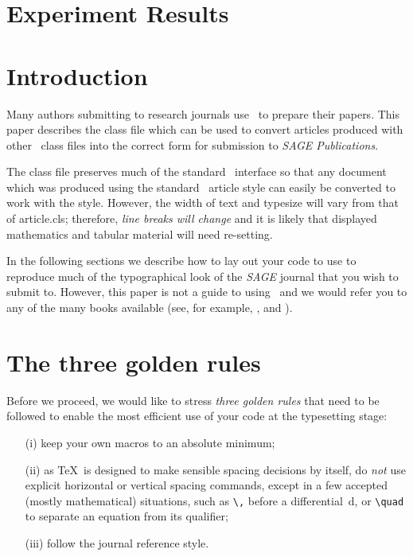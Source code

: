 \documentclass[Afour,sageh,times]{sagej}
\begin{document}
\section{Experiment Results}
\section{Introduction}
Many authors submitting to research journals use \LaTeXe\ to
prepare their papers. This paper describes the
\textsf{\journalclass} class file which can be used to convert
articles produced with other \LaTeXe\ class files into the correct
form for submission to \textit{SAGE Publications}.

The \textsf{\journalclass} class file preserves much of the
standard \LaTeXe\ interface so that any document which was
produced using the standard \LaTeXe\ \textsf{article} style can
easily be converted to work with the \textsf{\journalclassshort}
style. However, the width of text and typesize will vary from that
of \textsf{article.cls}; therefore, \textit{line breaks will change}
and it is likely that displayed mathematics and tabular material
will need re-setting.

In the following sections we describe how to lay out your code to
use \textsf{\journalclass} to reproduce much of the typographical look of
the \textit{SAGE} journal that you wish to submit to. However, this paper is not a guide to
using \LaTeXe\ and we would refer you to any of the many books
available (see, for example, \cite{R1}, \cite{R2} and \cite{R3}).

\section{The three golden rules}
Before we proceed, we would like to stress \textit{three golden
rules} that need to be followed to enable the most efficient use
of your code at the typesetting stage:
\begin{enumerate}
\item[(i)] keep your own macros to an absolute minimum;

\item[(ii)] as \TeX\ is designed to make sensible spacing
decisions by itself, do \textit{not} use explicit horizontal or
vertical spacing commands, except in a few accepted (mostly
mathematical) situations, such as \verb"\," before a
differential~d, or \verb"\quad" to separate an equation from its
qualifier;

\item[(iii)] follow the journal reference style.
\end{enumerate}
\end{document}
